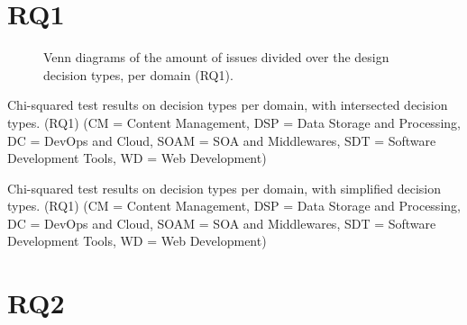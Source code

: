 \documentclass[10pt,a4paper,twocolumn]{article}
\begin{document}
\section{RQ1}

\begin{figure}[!th]
    \centering
    
    
      
    \caption{Venn diagrams of the amount of issues divided over the design decision types, per domain (RQ1).}
    \label{fig:rq1_domainspecific}
\end{figure}

\begin{table}[]
    \centering

    \caption{Chi-squared test results on decision types per domain, with intersected decision types. (RQ1) (CM = Content Management, DSP = Data Storage and Processing, DC = DevOps and Cloud, SOAM = SOA and Middlewares, SDT = Software Development Tools, WD = Web Development)}
    \label{table:rq1_intersected}
\end{table}

\begin{table}[]
    \centering

    \caption{Chi-squared test results on decision types per domain, with simplified decision types. (RQ1) (CM = Content Management, DSP = Data Storage and Processing, DC = DevOps and Cloud, SOAM = SOA and Middlewares, SDT = Software Development Tools, WD = Web Development)}
    \label{table:rq1_simplified}
\end{table}

\section{RQ2}

\end{document}
